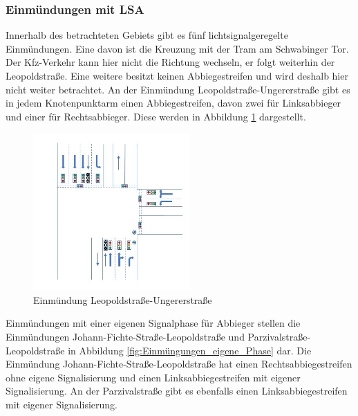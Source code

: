 \subsubsection{Einmündungen mit LSA}
Innerhalb des betrachteten Gebiets gibt es fünf lichtsignalgeregelte Einmündungen. Eine davon ist die Kreuzung mit der Tram am Schwabinger Tor. Der Kfz-Verkehr kann hier nicht die Richtung wechseln, er folgt weiterhin der Leopoldstraße. Eine weitere besitzt keinen Abbiegestreifen und wird deshalb hier nicht weiter betrachtet. An der Einmündung Leopoldstraße-Ungererstraße gibt es in jedem Knotenpunktarm einen Abbiegestreifen, davon zwei für Linksabbieger und einer für Rechtsabbieger. Diese werden in Abbildung \ref{fig:Einmüngung_Abbiegestreifen} dargestellt.

\begin{savenotes}
	\begin{figure}[H]
		\centering
		\includegraphics[width=6cm,height=6cm]{figures/Einmuendung_Abbiegestreifen}
		\caption[Einmündung Leopoldstraaße-Ungererstraße]{Einmündung Leopoldstraße-Ungererstraße \parencite{Kutsch.05.04.2018}}\label{fig:Einmüngung_Abbiegestreifen}
	\end{figure}
\end{savenotes}

Einmündungen mit einer eigenen Signalphase für Abbieger stellen die Einmündungen Johann-Fichte-Straße-Leopoldstraße und Parzivalstraße-Leopoldstraße in Abbildung \ref{fig:Einmüngungen_eigene_Phase} dar. Die Einmündung Johann-Fichte-Straße-Leopoldstraße hat einen Rechtsabbiegestreifen ohne eigene Signalisierung und einen Linksabbiegestreifen mit eigener Signalisierung. An der Parzivalstraße gibt es ebenfalls einen Linksabbiegestreifen mit eigener Signalisierung.  

